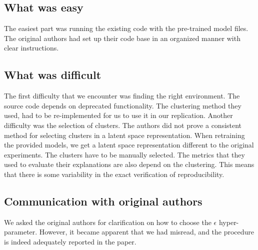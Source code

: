 \subsection*{What was easy}
The easiest part was running the existing code with the pre-trained model files. The original authors had set up their code base in an organized manner with clear instructions.

\subsection*{What was difficult}

The first difficulty that we encounter was finding the right environment. The source code depends on deprecated functionality. The clustering method they used, had to be re-implemented for us to use it in our replication. Another difficulty was the selection of clusters. The authors did not prove a consistent method for selecting clusters in a latent space representation. When retraining the provided models, we get a latent space representation different to the original experiments. The clusters have to be manually selected. The metrics that they used to evaluate their explanations are also depend on the clustering. This means that there is some variability in the exact verification of reproducibility.

\subsection*{Communication with original authors}
We asked the original authors for clarification on how to choose the $\epsilon$ hyper-parameter. However, it became apparent that we had misread, and the procedure is indeed adequately reported in the paper.

\newpage


